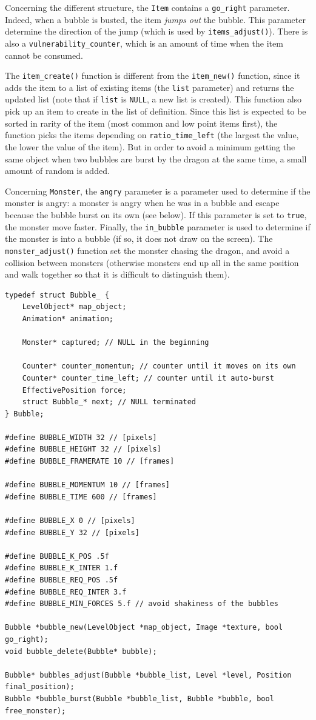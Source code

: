 \documentclass[12pt,a4paper]{article}
\newcommand{\cc}[1]{\texttt{#1}}
\begin{document}
Concerning the different structure, the \cc{Item} contains a \cc{go_right} parameter. Indeed, when a bubble is busted, the item \textit{jumps out} the bubble. This parameter determine the direction of the jump (which is used by \cc{items_adjust()}). There is also a \cc{vulnerability_counter}, which is an amount of time when the item cannot be consumed.

The \cc{item_create()} function is different from the \cc{item_new()} function, since it adds the item to a list of existing items (the \cc{list} parameter) and returns the updated list (note that if \cc{list} is \cc{NULL}, a new list is created). This function also pick up an item to create in the list of definition. Since this list is expected to be sorted in rarity of the item (most common and low point items first), the function picks the items depending on \cc{ratio_time_left} (the largest the value, the lower the value of the item). But in order to avoid a minimum getting the same object when two bubbles are burst by the dragon at the same time, a small amount of random is added.

Concerning \cc{Monster}, the \cc{angry} parameter is a parameter used to determine if the monster is angry: a monster is angry when he was in a bubble and escape because the bubble burst on its own (see below). If this parameter is set to \cc{true}, the monster move faster. Finally, the \cc{in_bubble} parameter is used to determine if the monster is into a bubble (if so, it does not draw on the screen). The \cc{monster_adjust()} function set the monster chasing the dragon, and avoid a collision between monsters (otherwise monsters end up all in the same position and walk together so that it is difficult to distinguish them).

\begin{verbatim}
typedef struct Bubble_ {
    LevelObject* map_object;
    Animation* animation;

    Monster* captured; // NULL in the beginning

    Counter* counter_momentum; // counter until it moves on its own
    Counter* counter_time_left; // counter until it auto-burst
    EffectivePosition force;
    struct Bubble_* next; // NULL terminated
} Bubble;

#define BUBBLE_WIDTH 32 // [pixels]
#define BUBBLE_HEIGHT 32 // [pixels]
#define BUBBLE_FRAMERATE 10 // [frames]

#define BUBBLE_MOMENTUM 10 // [frames]
#define BUBBLE_TIME 600 // [frames]

#define BUBBLE_X 0 // [pixels]
#define BUBBLE_Y 32 // [pixels]

#define BUBBLE_K_POS .5f
#define BUBBLE_K_INTER 1.f
#define BUBBLE_REQ_POS .5f
#define BUBBLE_REQ_INTER 3.f
#define BUBBLE_MIN_FORCES 5.f // avoid shakiness of the bubbles

Bubble *bubble_new(LevelObject *map_object, Image *texture, bool go_right);
void bubble_delete(Bubble* bubble);

Bubble* bubbles_adjust(Bubble *bubble_list, Level *level, Position final_position);
Bubble *bubble_burst(Bubble *bubble_list, Bubble *bubble, bool free_monster);
\end{verbatim}
\end{document}
